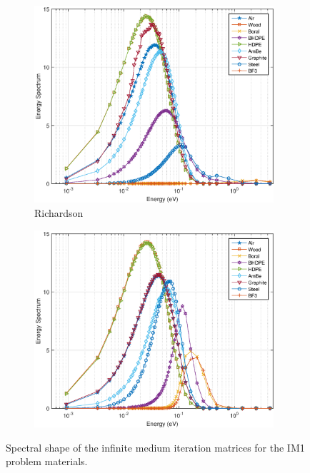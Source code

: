 \begin{figure}
\centering
	\begin{subfigure}[b]{0.775\textwidth}
		\centering
		\includegraphics[width=0.975\textwidth]{figures/sec_DSA/IM1_EC_Jac.eps}
		\caption{Richardson}
	\end{subfigure}
	
	\begin{subfigure}[b]{0.775\textwidth}
		\centering
		\includegraphics[width=0.975\textwidth]{figures/sec_DSA/IM1_EC_GS.eps}
		\caption{}
	\end{subfigure}
\caption{Spectral shape of the infinite medium iteration matrices for the IM1 problem materials.}
\label{fig::IM1_mats_EC}
\end{figure}

